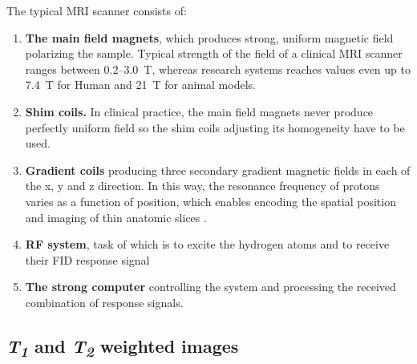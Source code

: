The typical MRI scanner consists of:
\begin{enumerate}
\item \textbf{The main field magnets}, which produces strong, uniform magnetic field polarizing the sample. Typical strength of the field of a clinical MRI scanner ranges between 0.2--3.0\, T, whereas research systems reaches values even up to 7.4\, T for Human and 21\, T for animal models.
\item \textbf{Shim coils.} In clinical practice, the main field magnets never produce perfectly uniform field so the shim coils adjusting its homogeneity have to be used.   
\item \textbf{Gradient coils} producing three secondary gradient magnetic fields in each of the x, y and z direction. In this way, the resonance frequency of protons varies as a function of position, which enables encoding the spatial position and imaging of thin anatomic slices \cite{hidalgo2010theory}.
\item \textbf{RF system}, task of which is to excite the hydrogen atoms and to receive their FID response signal
\item \textbf{The strong computer} controlling the system and processing the received combination of response signals.
\end{enumerate}

\subsection{\textit{T\textsubscript{1}} and \textit{T\textsubscript{2}} weighted images}

